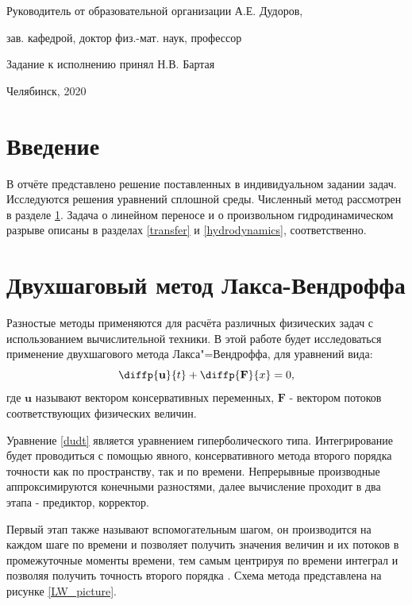 \documentclass[a4paper]{article}
\begin{document}
\begin{titlepage}
	Руководитель от образовательной организации \enspace\hrulefill \hspace{0.2cm} А.Е. Дудоров,
	
	зав. кафедрой, доктор физ.-мат. наук, профессор \vspace{3pt}
	
	Задание к исполнению принял \enspace\hrulefill \hspace{0.2cm} Н.В. Бартая
	
	
	\vfill
	\begin{center}
		Челябинск, 2020	
	\end{center}
\end{titlepage}
\restoregeometry	

\tableofcontents
\setcounter{page}{3}
\newpage

	\section*{Введение}
	В отчёте представлено решение поставленных в индивидуальном задании задач. Исследуются решения уравнений сплошной среды. Численный метод рассмотрен в разделе \ref{Lax-Wendroff}. 
	Задача о линейном переносе и о произвольном гидродинамическом разрыве описаны в разделах \ref{transfer} и \ref{hydrodynamics}, соответственно.
	
	\section{Двухшаговый метод Лакса-Вендроффа}\label{Lax-Wendroff}
	Разностые методы применяются для расчёта различных физических задач с использованием вычислительной техники. В этой работе будет исследоваться применение двухшагового метода Лакса"=Вендроффа, для уравнений вида: 
	\begin{equation}\label{dudt}
	\diffp{\mathbf{u}}{t} + \diffp{\mathbf{F}}{x} = 0 ,
	\end{equation}
	где $\mathbf{u}$ называют вектором консервативных переменных, $\mathbf{F}$ - вектором потоков соответствующих физических величин.
	
	Уравнение \ref{dudt} является уравнением гиперболического типа. Интегрирование будет проводиться с помощью явного, консервативного метода второго порядка точности как по пространству, так и по времени. Непрерывные производные аппроксимируются конечными разностями, далее вычисление проходит в два этапа - предиктор, корректор. 
	
	Первый этап также называют вспомогательным шагом, он производится на каждом шаге по времени и позволяет получить значения величин и их потоков в промежуточные моменты времени, тем самым центрируя по времени интеграл и позволяя получить точность второго порядка \cite{Potter}. Схема метода представлена на рисунке \ref{LW_picture}.
		
\end{document}
